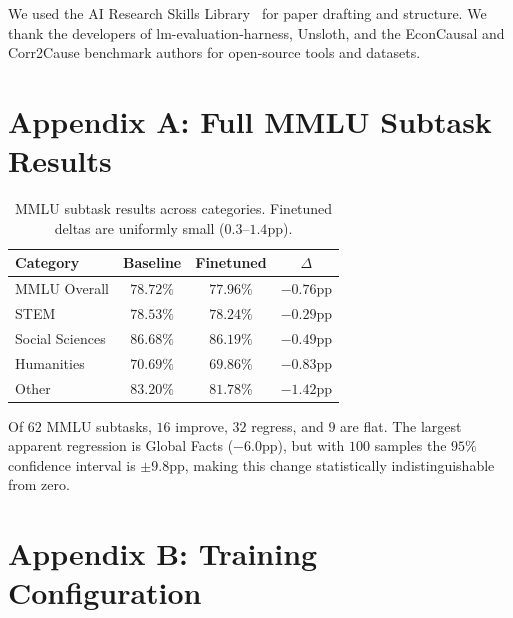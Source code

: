 \documentclass[11pt]{article}
\begin{document}
We used the AI Research Skills Library~\cite{ai_research_skills} for paper drafting and structure. We thank the developers of lm-evaluation-harness, Unsloth, and the EconCausal and Corr2Cause benchmark authors for open-source tools and datasets.




\appendix

\section{Appendix A: Full MMLU Subtask Results}

\begin{table}
\caption{MMLU subtask results across categories. Finetuned deltas are uniformly small ($0.3$--$1.4$pp).}
\label{tab:mmlu_full}
\begin{tabular}{lccc}
\toprule
Category & Baseline & Finetuned & $\Delta$ \\
\midrule
MMLU Overall & $78.72\%$ & $77.96\%$ & $-0.76$pp \\
STEM & $78.53\%$ & $78.24\%$ & $-0.29$pp \\
Social Sciences & $86.68\%$ & $86.19\%$ & $-0.49$pp \\
Humanities & $70.69\%$ & $69.86\%$ & $-0.83$pp \\
Other & $83.20\%$ & $81.78\%$ & $-1.42$pp \\
\bottomrule
\end{tabular}
\end{table}

Of $62$ MMLU subtasks, $16$ improve, $32$ regress, and $9$ are flat. The largest apparent regression is Global Facts ($-6.0$pp), but with $100$ samples the $95\%$ confidence interval is $\pm9.8$pp, making this change statistically indistinguishable from zero.

\section{Appendix B: Training Configuration}
\end{document}
